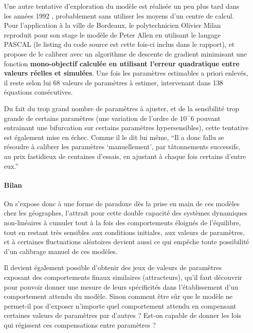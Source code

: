 Une autre tentative d'exploration du modèle est réalisée un peu plus tard dans les années 1992 \autocite{Milan1992}, probablement sans utiliser les moyens d'un centre de calcul. Pour l'application à la ville de Bordeaux, le polytechnicien Olivier Milan reproduit \autocite{Wilensky2007a} pour son stage le modèle de Peter Allen en utilisant le langage PASCAL (le listing du code source est cette fois-ci inclus dans le rapport), et propose de le calibrer avec un algorithme de descente de gradient minimisant une fonction \textbf{mono-objectif calculée en utilisant l'erreur quadratique entre valeurs réelles et simulées}. Une fois les paramètres estimables a priori enlevés, il reste selon lui 68 valeurs de paramètres à estimer, intervenant dans 138 équations consécutives.

Du fait du trop grand nombre de paramètres à ajuster, et de la sensibilité trop grande de certains paramètres (une variation de l'ordre de $10^-6$ pouvant entrainant une bifurcation sur certains paramètres hypersensibles), cette tentative est également mise en échec. Comme il le dit lui même, \enquote{Il a donc fallu se résoudre à calibrer les paramètres \enquote{manuellement}, par tâtonnements successifs, au prix fastidieux de centaines d'essais, en ajustant à chaque fois certains d'entre eux.}  %

\paragraph{Bilan}

On s'expose donc à une forme de paradoxe dès la prise en main de ces modèles chez les géographes, l'attrait pour cette double capacité des systèmes dynamiques non-linéaires à cumuler tout à la fois des comportements éloignés de l'équilibre, tout en restant très sensibles aux conditions initiales, aux valeurs de paramètres, et à certaines fluctuations aléatoires devient aussi ce qui empêche toute possibilité d'un calibrage manuel de ces modèles.

Il devient également possible d'obtenir des jeux de valeurs de paramètres exposant des comportements finaux similaires (attracteurs), qu'il faut découvrir pour pouvoir donner une mesure de leurs spécificités dans l'établissement d'un comportement attendu du modèle. Sinon comment être sûr que le modèle ne permet-il pas d'exposer n'importe quel comportement attendu en compensant certaines valeurs de paramètres par d'autres ? Est-on capable de donner les lois qui régissent ces compensations entre paramètres ?

